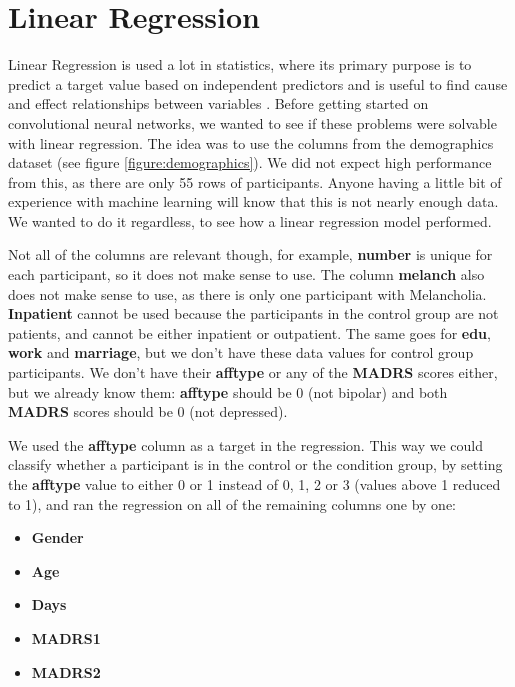 \section{Linear Regression}

Linear Regression is used a lot in statistics, where its primary purpose is to predict a target value based on independent predictors and is useful to find cause and effect relationships between variables \cite{linear_regression}. Before getting started on convolutional neural networks, we wanted to see if these problems were solvable with linear regression. The idea was to use the columns from the demographics dataset (see figure \ref{figure:demographics}). We did not expect high performance from this, as there are only 55 rows of participants. Anyone having a little bit of experience with machine learning will know that this is not nearly enough data. We wanted to do it regardless, to see how a linear regression model performed.

Not all of the columns are relevant though, for example, \textbf{number} is unique for each participant, so it does not make sense to use. The column \textbf{melanch} also does not make sense to use, as there is only one participant with Melancholia. \textbf{Inpatient} cannot be used because the participants in the control group are not patients, and cannot be either inpatient or outpatient. The same goes for \textbf{edu}, \textbf{work} and \textbf{marriage}, but we don't have these data values for control group participants. We don't have their \textbf{afftype} or any of the \textbf{MADRS} scores either, but we already know them: \textbf{afftype} should be 0 (not bipolar) and both \textbf{MADRS} scores should be 0 (not depressed). 

We used the \textbf{afftype} column as a target in the regression. This way we could classify whether a participant is in the control or the condition group, by setting the \textbf{afftype} value to either 0 or 1 instead of 0, 1, 2 or 3 (values above 1 reduced to 1), and ran the regression on all of the remaining columns one by one:

\begin{itemize}
      \item \textbf{Gender}
      \item \textbf{Age}
      \item \textbf{Days}
      \item \textbf{MADRS1}
      \item \textbf{MADRS2}
\end{itemize}

